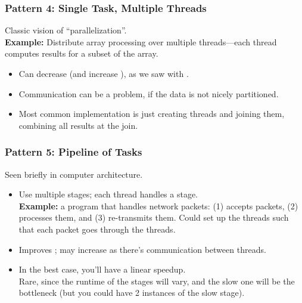 \documentclass[aspectratio=43]{beamer}
\newenvironment{changemargin}[1]{%
  \begin{list}{}{%
    \setlength{\topsep}{0pt}%
    \setlength{\leftmargin}{#1}%
    \setlength{\rightmargin}{1em}
    \setlength{\listparindent}{\parindent}%
    \setlength{\itemindent}{\parindent}%
    \setlength{\parsep}{\parskip}%
  }%
  \item[]}{\end{list}}
\begin{document}
\begin{frame}
  \frametitle{Pattern 4: Single Task, Multiple Threads}

  \begin{changemargin}{2.5cm}
  Classic vision of ``parallelization''.\\[1em]

  {\bf Example:} Distribute array processing over multiple 
      threads---each thread computes results for a subset of the array.

  \begin{itemize}
    \item Can decrease  (and increase
      ), as we saw with .
    \item Communication can be a problem, if the data is not nicely partitioned.
    \item Most common implementation is just creating threads and joining them,
      combining all results at the join.
  \end{itemize}
  \end{changemargin}
\end{frame}

\begin{frame}
  \frametitle{Pattern 5: Pipeline of Tasks}

  \begin{changemargin}{2.5cm}
    Seen briefly in computer architecture.

    \begin{itemize}
    \item Use multiple stages; each thread handles a stage.\\[1em]
     {\bf Example:} a program that handles network packets: (1) accepts
      packets, (2) processes them, and (3) re-transmits them. Could set up the threads such that each packet goes through the threads.
    \vfill
    \item Improves ; may increase  as
      there's communication between threads.
    \vfill
    \item In the best case, you'll have a linear speedup.\\[1em]

     Rare, since the runtime of the stages will vary, and the slow
      one will be the bottleneck (but you could have 2 instances of the
      slow stage).
  \end{itemize}
  \end{changemargin}
\end{frame}
\end{document}
